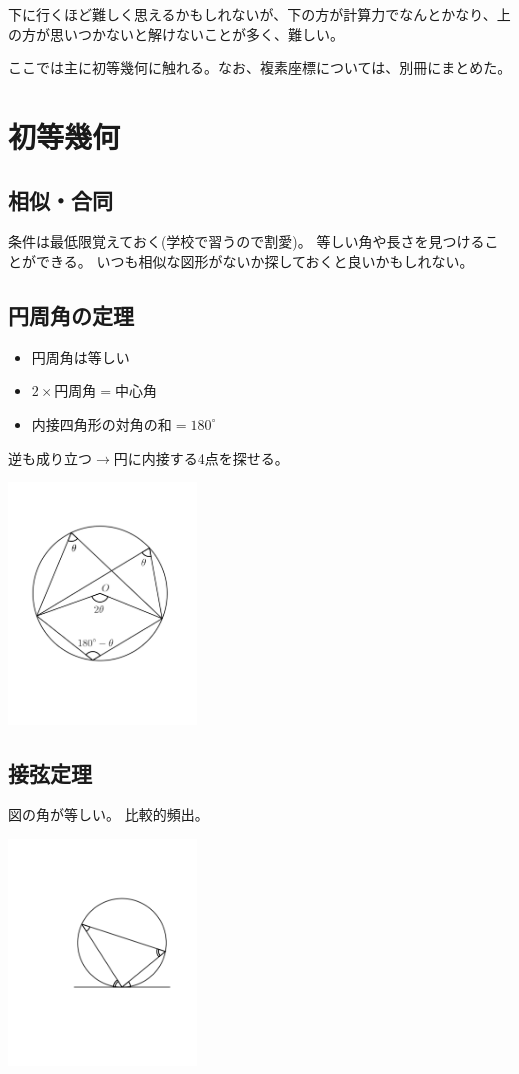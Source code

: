 \documentclass[uplatex,dvipdfmx]{jsbook}
\begin{document}
下に行くほど難しく思えるかもしれないが、下の方が計算力でなんとかなり、上の方が思いつかないと解けないことが多く、難しい。

ここでは主に初等幾何に触れる。なお、複素座標については、別冊にまとめた。
\section{初等幾何}

\subsection{相似・合同}
条件は最低限覚えておく(学校で習うので割愛)。
等しい角や長さを見つけることができる。
いつも相似な図形がないか探しておくと良いかもしれない。

\subsection{円周角の定理}

\begin{itemize}
    \item 円周角は等しい
    \item $2\times\text{円周角}=\text{中心角}$
    \item 内接四角形の対角の和$=180^{\circ}$
\end{itemize}

逆も成り立つ$\rightarrow$円に内接する4点を探せる。

\includegraphics[clip,width=5cm]{figures/inscribed-angle.pdf}

\subsection{接弦定理}
図の角が等しい。
比較的頻出。

\includegraphics[clip,width=5cm]{figures/setsugen.pdf}
\end{document}
